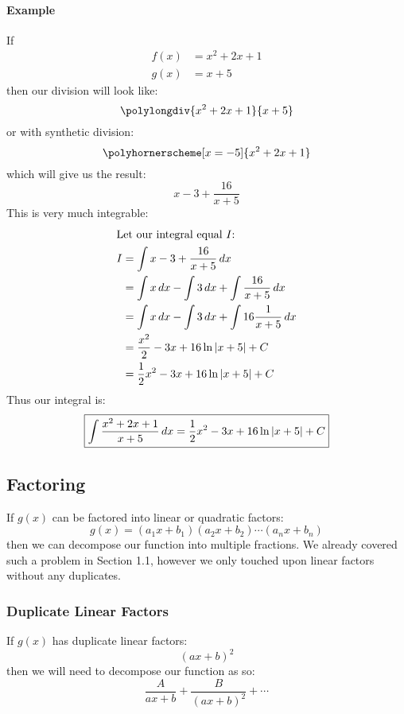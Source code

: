 \documentclass[12pt]{article}
\begin{document}
\paragraph{Example} If
\begin{align*}
    f(x) &= x^2+2x+1 \\
    g(x) &= x+5
\end{align*}
then our division will look like:
\begin{equation*}
    \polylongdiv{x^2+2x+1}{x+5}
\end{equation*}
or with synthetic division:
\begin{equation*}
    \polyhornerscheme[x=-5]{x^2+2x+1}
\end{equation*}
which will give us the result:
\[ x-3 + \frac{16}{x+5} \]
This is very much integrable:
\begin{align*}
    \intertext{Let our integral equal $I$:}
    I &= \int x-3 + \frac{16}{x+5}\,dx \\
      &= \int x\,dx - \int 3\,dx + \int \frac{16}{x+5}\,dx \\ 
      &= \int x\,dx - \int 3\,dx + \int 16\frac{1}{x+5}\,dx \\
      &= \frac{x^2}{2} - 3x + 16\ln\abs{x+5} + C \\
      &= \frac{1}{2}x^2 - 3x + 16\ln\abs{x+5} + C  
\end{align*}
Thus our integral is:
\[ \boxed{\int\frac{x^2+2x+1}{x+5}\,dx = \frac{1}{2}x^2 - 3x + 16\ln\abs{x+5} + C} \]
\subsection{Factoring}
If $g(x)$ can be factored into linear or quadratic factors:
\[ g(x) = (a_1x+b_1)(a_2x+b_2)\cdots(a_nx+b_n) \]
then we can decompose our function into multiple fractions. We already covered such 
a problem in Section 1.1, however we only touched upon linear factors without any
duplicates.  
\subsubsection{Duplicate Linear Factors} If $g(x)$ has duplicate linear factors:
\[ {(ax+b)}^2 \]
then we will need to decompose our function as so:
\[ \frac{A}{ax+b} + \frac{B}{(ax+b)^2} + \cdots \]
\end{document}

